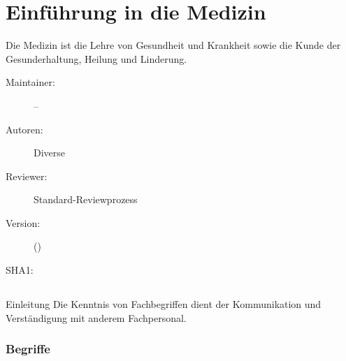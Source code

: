 \def\ChapterCode{EIN}
\chapter
[\CO{[EIN]} Einführung in die Medizin]
{Einführung in die Medizin}
\label{chp:EIN}

\ChapterIntro
{%
Die Medizin ist die Lehre von Gesundheit und
Krankheit sowie die Kunde der Gesunderhaltung, Heilung und
Linderung.
}
{%
\begin{description}
  \item[Maintainer:] --
  \item[Autoren:] Diverse
  \item[Reviewer:] Standard-Reviewprozess
  \item[Version:] {\VarDocVersionTypeName} ({\VarDocVersionTypeDescription})
  \item[SHA1:] {\DocGitCommit}
\end{description}

{\TxTeilkapitelAASS}
}



\clearpage %
\section{}

\nocite{BrockhausDrei1Bd2}
\nocite{BrockhausDrei2Bd2}
\nocite{BrockhausDrei3Bd2}
\nocite{BertelsmannVolkslexikon25}
\nocite{Pschy259}



\Text
{{Einleitung}}%
{%
Die Kenntnis von Fachbegriffen dient der Kommunikation und
Verständigung mit anderem Fachpersonal.
}%



\subsection{ Begriffe}


% 


